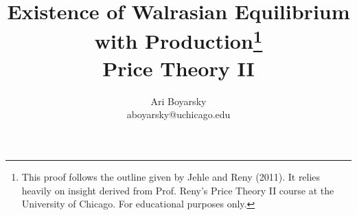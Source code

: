 \documentclass[dvips,11pt]{article}
\DeclareMathOperator{\?}{\,?\,}
\begin{document}

\title{Existence of Walrasian Equilibrium with Production\footnote{This proof follows the outline given by Jehle and Reny (2011). It relies heavily on insight derived from Prof. Reny's Price Theory II course at the University of Chicago. For educational purposes only.} \\ Price Theory II}
\author{Ari Boyarsky \\ aboyarsky@uchicago.edu}

\maketitle

\end{document}
